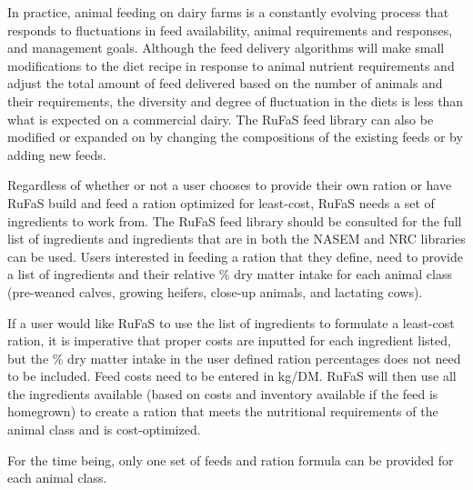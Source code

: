 \documentclass[
  letterpaper,
  oneside,
  openany]{scrbook}
\begin{document}
In practice, animal feeding on dairy farms is a constantly evolving
process that responds to fluctuations in feed availability, animal
requirements and responses, and management goals. Although the feed
delivery algorithms will make small modifications to the diet recipe in
response to animal nutrient requirements and adjust the total amount of
feed delivered based on the number of animals and their requirements,
the diversity and degree of fluctuation in the diets is less than what
is expected on a commercial dairy. The RuFaS feed library can also be
modified or expanded on by changing the compositions of the existing
feeds or by adding new feeds.

Regardless of whether or not a user chooses to provide their own ration
or have RuFaS build and feed a ration optimized for least-cost, RuFaS
needs a set of ingredients to work from. The RuFaS feed library should
be consulted for the full list of ingredients and ingredients that are
in both the NASEM and NRC libraries can be used. Users interested in
feeding a ration that they define, need to provide a list of ingredients
and their relative \% dry matter intake for each animal class
(pre-weaned calves, growing heifers, close-up animals, and lactating
cows).

If a user would like RuFaS to use the list of ingredients to formulate a
least-cost ration, it is imperative that proper costs are inputted for
each ingredient listed, but the \% dry matter intake in the user defined
ration percentages does not need to be included. Feed costs need to be
entered in kg/DM. RuFaS will then use all the ingredients available
(based on costs and inventory available if the feed is homegrown) to
create a ration that meets the nutritional requirements of the animal
class and is cost-optimized.

\begin{tcolorbox}[enhanced jigsaw, arc=.35mm, bottomrule=.15mm, bottomtitle=1mm, breakable, colback=white, colbacktitle=quarto-callout-note-color!10!white, colframe=quarto-callout-note-color-frame, coltitle=black, left=2mm, leftrule=.75mm, opacityback=0, opacitybacktitle=0.6, rightrule=.15mm, title=\textcolor{quarto-callout-note-color}{\faInfo}\hspace{0.5em}{Note}, titlerule=0mm, toprule=.15mm, toptitle=1mm]

For the time being, only one set of feeds and ration formula can be
provided for each animal class.

\end{tcolorbox}
\end{document}

